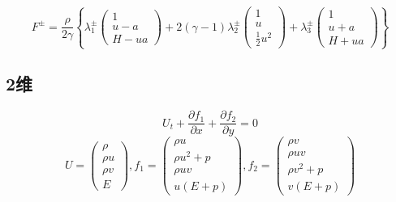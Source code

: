 \documentclass[UTF8]{ctexart}
\begin{document}
  \begin{equation*}
       F^{\pm}=  \frac{\rho}{2\gamma} \left\{
       \lambda_1^{\pm} \left( \begin{matrix}
         1 \\
         u-a \\
         H-ua
       \end{matrix} \right)
       +2(\gamma-1)\lambda_2^{\pm} \left( \begin{matrix}
         1 \\
         u \\
         \frac{1}{2}u^2
       \end{matrix} \right)
        +\lambda_3^{\pm} \left( \begin{matrix}
         1 \\
         u+a \\
         H+ua
       \end{matrix} \right)
        \right\}
  \end{equation*}

  \subsection{2维}
\begin{equation*}
     U_t+\frac{\partial f_1}{\partial x} + \frac{\partial f_2}{\partial y} =0
     \end{equation*}
     \begin{equation*}
     U=\left( \begin{matrix}
                \rho \\
                \rho u \\
                \rho v \\
                E
              \end{matrix}\right) ,  f_1=\left( \begin{matrix}
                \rho u \\
                \rho u^2+p \\
                \rho uv \\
                u(E+p)
              \end{matrix}\right), f_2=\left( \begin{matrix}
                \rho v \\
                \rho uv \\
                \rho v^2+p \\
                v(E+p)
              \end{matrix}\right)
\end{equation*}
\end{document}
